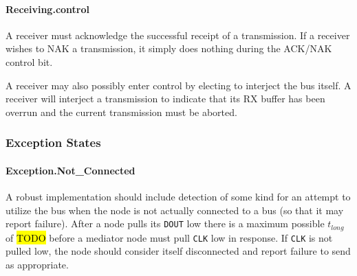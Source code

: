 \paragraph{Receiving.{\sc control}}
A receiver must acknowledge the successful receipt of a transmission. If a
receiver wishes to NAK a transmission, it simply does nothing during the
ACK/NAK control bit.

A receiver may also possibly enter control by electing to interject the bus
itself. A receiver will interject a transmission to indicate that its RX
buffer has been overrun and the current transmission must be aborted.

\subsubsection{Exception States}

\paragraph{Exception.{\sc Not\_Connected}}
A robust implementation should include detection of some kind for an attempt
to utilize the bus when the node is not actually connected to a bus (so that
it may report failure). After a node pulls its {\tt DOUT} low there is a
maximum possible $t_{long}$ of \hl{TODO} before a mediator node must pull
{\tt CLK} low in response. If {\tt CLK} is not pulled low, the node should
consider itself disconnected and report failure to send as appropriate.
